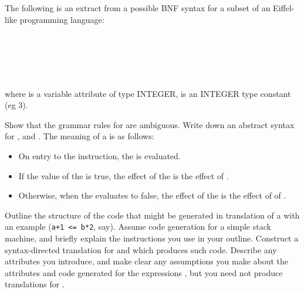 \begin{questions}
The following is an extract from a possible BNF syntax for
a subset of an Eiffel-like programming language: 
\begin{bnf}
 \\
 \\
\\
\\
\end{bnf}
where  is a variable attribute of type INTEGER, 
is an INTEGER type constant (eg 3).
\begin{subquestions}
\subquestion
Show that the grammar rules for  are ambiguous.
\subquestion
Write down an abstract syntax for , 
 and .
\subquestion
The meaning of a  is as follows:
\begin{itemize}
\item On entry to the instruction, the  is 
	evaluated. 
\item If the value of the  is true, the effect of
	the  is the effect of .
\item Otherwise, when the  evaluates to false,
	the effect of the  is the effect of
	of .
\end{itemize}
\begin{subsubquestions}
\subsubquestion
	Outline the structure of the
        code that might be generated in translation of
        a  with an example 
	 (\verb"a+1 <= b*2", say). 
	Assume code generation for a simple
        stack machine, and briefly explain the
	instructions you use in your outline.
\subsubquestion
        Construct a syntax-directed translation for 
         and  which produces such code.
        Describe any attributes you
        introduce, and make clear any assumptions you make about 
        the attributes and code generated for the
        expressions , but you need not produce translations for
	.
\end{subsubquestions}


\end{subquestions}
\end{questions}
